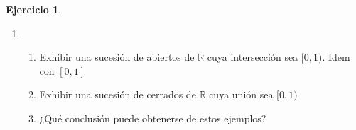 \documentclass[12pt]{report}
\newcommand{\R}{\mathbb{R}}
\newcommand{\N}{\mathbb{N}}
\theoremstyle{definition}
\newtheorem{ej}{Ejercicio}
\begin{document}
\begin{ej}
\begin{enumerate}
\begin{proof}
  Veamosló. $x \in F$ entonces $x \in B(x,\frac{1}{n})\quad \forall n \in \N$ entonces $x \in U_n \quad \forall n \in \N$

Entonces $y \in \bigcap U_n$

Sea $y \in \bigcap U_n$ entonces $y \in U_n \quad \forall n \in \N$ entonces para cada $n \in \N$ sabemos que $y $ pertenece a alguna de esas bolas, otra forma de decirlo $y \in B(x_n,\frac{1}{n})$ para algún $x_n \in F$ pero entonces dado un $\epsilon > 0$ sabemos que existe un $n_0 \in \N$ tal que $\frac{1}{n_0} \leq \epsilon$ pero ademas sabemos que para todo $n > n_0 $ sucede $\frac{1}{n} \leq \frac{1}{n_0} \leq \epsilon $ por ende $d(x_n , y) \leq \epsilon \quad \forall n \geq n_0$

Pero entonces $x_n$ converge a $y$ y además $x_n \in F \quad \forall n \in \N$ y como $F$ es cerrado tenemos que $y \in F$

Forma B. Sea $G$ abierto
$$U_n = \bigcup_{x \in X \setminus G}B(x,\frac{1}{n}) $$

Luego tenemos $F_n = X \setminus U_n$ que es complemento de abierto por lo tanto cerrado.

Ahora afirmo que $G = \bigcup F_n$ que es unión de cerrados por lo tanto $F_{\sigma}$

Veamosló, sea $y \in G$ supongamos $y \notin \bigcup F_n $ entonces $y \notin F_n \quad \forall n \in \N$

Entonces $y \in U_n \quad \forall n \in \N$ por lo tanto $y \in \bigcap U_n$ por el mismo argumento que antes esto implica que $y \in X \setminus G $ , lo que es absurdo. Luego $y \in \bigcup F_n$

Sea $y \in \bigcup F_n$ entonces $y \in F_n \quad \forall n \in \N$ entonces $y \notin U_n \quad \forall n \in \N$ 

Supongamos $y \notin G$ entonces $y \in X \setminus G$ pero entonces $y \in U_n$ para algún $n \in \N$ seguro

Lo que es absurdo , entonces $y \in G$
\newpage
\end{proof}
  \item 
    \begin{enumerate}
      \item Exhibir una sucesión de abiertos de $\R$ cuya intersección sea $[0,1)$. Idem con $[0,1]$
      \item Exhibir una sucesión de cerrados de $\R$ cuya unión sea $[0,1)$
      \item ¿Qué conclusión puede obtenerse de estos ejemplos? 
    \end{enumerate}
\end{enumerate}
\end{ej}
\end{document}
